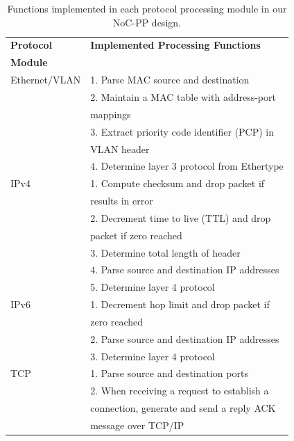 %
%
\begin{table}[!t]
\centering
\begin{small}
    \caption{Functions implemented in each protocol processing module in our NoC-PP design.}
    \label{tbl:proc}
    \begin{tabular}{ll}
    \toprule
    \textbf{Protocol} & \textbf{Implemented Processing Functions} \\
    \textbf{Module} &  \\
    \midrule
	Ethernet/VLAN & 1. Parse MAC source and destination   \\ 
	              & 2. Maintain a MAC table with address-port \\
	              &    mappings \\
	              & 3. Extract priority code identifier (PCP) in \\
	              &    VLAN header \\
	              & 4. Determine layer 3 protocol from Ethertype \\
	\midrule
	IPv4          & 1. Compute checksum and drop packet if  \\
	              &    results in error    \\
	              & 2. Decrement time to live (TTL) and drop \\
	              &    packet if zero reached\\
	              & 3. Determine total length of header \\
	              & 4. Parse source and destination IP addresses \\
	              & 5. Determine layer 4 protocol \\
	\midrule
    IPv6          & 1. Decrement hop limit and drop packet if \\
    			  &    zero reached   \\
    			  & 2. Parse source and destination IP addresses \\
    			  & 3. Determine layer 4 protocol \\
    \midrule
    TCP           & 1. Parse source and destination ports    \\
    			  & 2. When receiving a request to establish a \\
    			  &    connection, generate and send a reply ACK \\
    			  &    message over TCP/IP \\
    \bottomrule
    \end{tabular}
\end{small}
\end{table}
%
%

